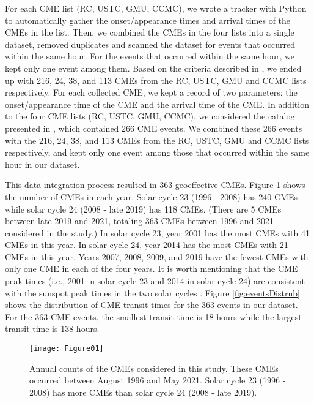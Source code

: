 \documentclass{article}
\begin{document}
For each CME list (RC, USTC, GMU, CCMC), 
we wrote a 
tracker
with Python to automatically gather 
the onset/appearance times and arrival times of the CMEs in the list.
Then, we combined the CMEs in the four lists into a single dataset,
removed duplicates and scanned the dataset for events 
that occurred within the same hour.
For the events that occurred within the same hour,
we kept only one event among them.
Based on the criteria described in \citet{2018ApJ...855..109L}, 
we ended up with 216, 24, 38, and 113 CMEs 
from the RC, USTC, GMU and CCMC lists respectively. 
For each collected CME,
we kept a record of two parameters:
the onset/appearance time of the CME and
the arrival time of the CME.
In addition to the four CME lists (RC, USTC, GMU, CCMC), 
we considered the catalog presented in \citet{2017SoPh..292...30P},
which contained 266 CME events. 
We combined
these 266 events with the 
216, 24, 38, and 113 CMEs 
from the RC, USTC, GMU and CCMC lists respectively,
and kept only one event among those that occurred within the same hour
in our dataset.
 
This data integration process resulted in 363 geoeffective CMEs.
Figure \ref{fig:annual_count} shows the number of CMEs in each year. 
Solar cycle 23 (1996 - 2008) has 240 CMEs while 
solar cycle 24 (2008 - late 2019) has 118 CMEs.
(There are 5 CMEs between late 2019 and 2021,
totaling 363 CMEs between 1996 and 2021 considered in the study.)
In solar cycle 23, year 2001 has the most CMEs with 41 CMEs in this year.
In solar cycle 24, year 2014 has the most CMEs with 
21 CMEs in this year.
Years 2007, 2008, 2009, and 2019 have the fewest CMEs with only one CME in each of the four years.
It is worth mentioning that the CME peak times 
(i.e., 2001 in solar cycle 23 and 2014 in solar cycle 24)
are consistent with the
sunspot peak times in the two solar cycles \citep{2021MNRAS.506.1916R}. 
Figure \ref{fig:eventsDistrub} shows the 
distribution of CME transit times for the 363 events
in our dataset. 
For the 363 CME events, the smallest transit time is 18 hours 
while the largest transit time is 138 hours.

\begin{figure}
\begin{center}
\texttt{[image: Figure01]}
\end{center}
\caption{Annual counts of the CMEs considered in this study.
These CMEs occurred between August 1996 and May 2021. 
Solar cycle 23 (1996 - 2008) has more CMEs than solar cycle 24 (2008 - late 2019).}
\label{fig:annual_count}
\end{figure}
\end{document}
